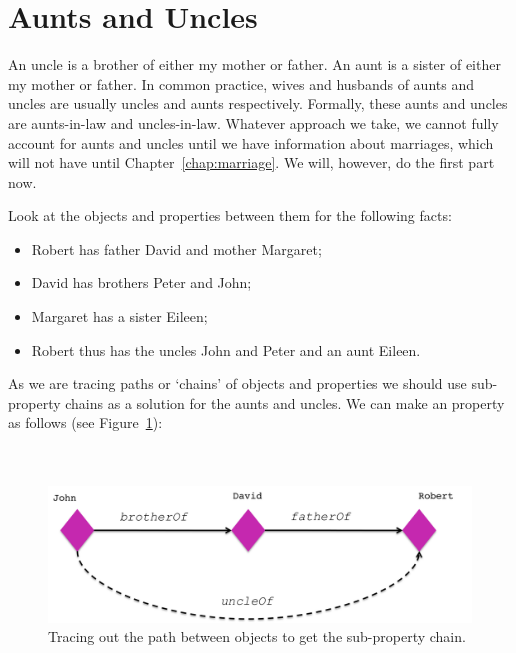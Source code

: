 {\section{Aunts and Uncles}

An uncle is a brother of either my mother or father. An aunt is a sister of either my mother or father. In common practice, wives and husbands of aunts and uncles are usually uncles and aunts respectively. Formally, these aunts and uncles are aunts-in-law and uncles-in-law. Whatever approach we take, we cannot fully account for aunts and uncles until we have information about marriages, which will not have until Chapter~\ref{chap:marriage}. We will, however, do the first part now.

Look at the objects and properties between them for the following facts:
\begin{itemize}
\item Robert has father David and mother Margaret;
\item David has brothers Peter and John;
\item Margaret has a sister Eileen;
\item Robert thus has the uncles John and Peter and an aunt Eileen.
\end{itemize}

As we are tracing paths or `chains' of objects and properties we should use sub-property chains as a solution for the aunts and uncles. We can make an  property as follows (see Figure~\ref{fig:uncle_path}):
\\\\
\\
\begin{figure}
\begin{center}
\includegraphics[width=\figwidth]{figures/uncle}\caption{Tracing out the path between objects to get the  sub-property chain.}\label{fig:uncle_path}
\end{center}
\end{figure}

}
